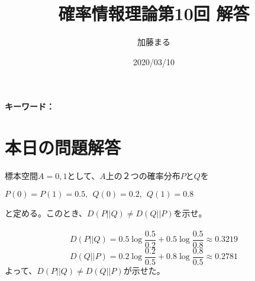 \documentclass[a4j,uplatex,dvipdfmx]{jsarticle}
\title{確率情報理論第10回 解答}
\author{加藤まる}
\date{2020/03/10}
\begin{document}
\maketitle
\bf キーワード：
\rm

\section*{本日の問題解答}
標本空間$A={0,1}$として、$A$上の２つの確率分布$PとQ$を
\begin{center}
  $P(0)=P(1)=0.5,~~Q(0)=0.2,~~Q(1)=0.8$
\end{center}
と定める。このとき、$D(P||Q)\neq D(Q||P)$を示せ。
\\ \\ 
\begin{equation}
  D(P||Q) = 0.5\log{\frac{0.5}{0.2}}+0.5\log{\frac{0.5}{0.8}} \approx 0.3219
\end{equation}
\begin{equation}
  D(Q||P)=0.2\log{\frac{0.2}{0.5}} +0.8\log{\frac{0.8}{0.5}}\approx 0.2781
\end{equation}
よって、$D(P||Q)\neq D(Q||P)$が示せた。
\end{document}
